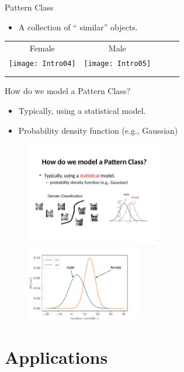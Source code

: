 \begin{frame}{Pattern Class}
\begin{itemize}
\item A collection of ``{\color{mycolor2} similar}'' objects.
\end{itemize}
\begin{table}[]
\centering
\begin{tabular}{c|clll}
Female & Male &  &  &  \\
\texttt{[image: Intro04]} & \texttt{[image: Intro05]} &  &  &  \\
  &   &  &  &  \\
  &   &  &  & 
\end{tabular}
\end{table}
\end{frame}

\begin{frame}{How do we model a Pattern Class?}
\begin{itemize}
\item Typically, using a statistical model.
\item Probability density function (e.g., Gaussian)
\end{itemize}
\begin{figure}
\includegraphics[width=6cm]{Figures/Intro06}~~~~
\includegraphics[width=5cm]{Figures/classProb}
\end{figure}
\end{frame}

\section{Applications}
\subsection{}

